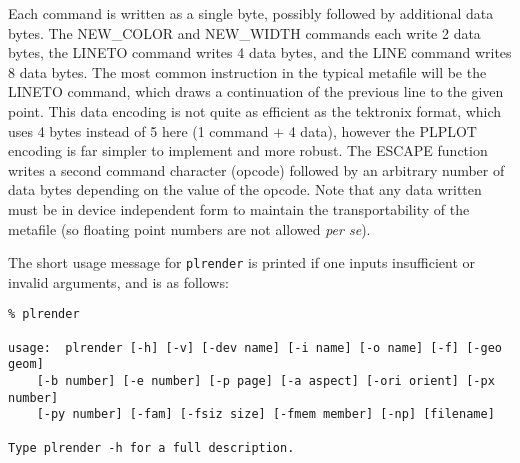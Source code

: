 Each command is written as a single byte, possibly followed by additional
data bytes.  The NEW\_COLOR and NEW\_WIDTH commands each write 2 data
bytes, the LINETO command writes 4 data bytes, and the LINE command writes
8 data bytes.  The most common instruction in the typical metafile will be
the LINETO command, which draws a continuation of the previous line to the
given point.  This data encoding is not quite as efficient as the tektronix
format, which uses 4 bytes instead of 5 here (1 command $+$ 4 data),
however the PLPLOT encoding is far simpler to implement and more robust.
The ESCAPE function writes a second command character (opcode) followed by
an arbitrary number of data bytes depending on the value of the opcode.
Note that any data written must be in device independent form to maintain
the transportability of the metafile (so floating point numbers are not
allowed {\it per se}). 

The short usage message for {\tt plrender} is printed if one inputs
insufficient or invalid arguments, and is as follows:
\begin{verbatim}
% plrender

usage:  plrender [-h] [-v] [-dev name] [-i name] [-o name] [-f] [-geo geom]
    [-b number] [-e number] [-p page] [-a aspect] [-ori orient] [-px number]
    [-py number] [-fam] [-fsiz size] [-fmem member] [-np] [filename]

Type plrender -h for a full description.
\end{verbatim}

